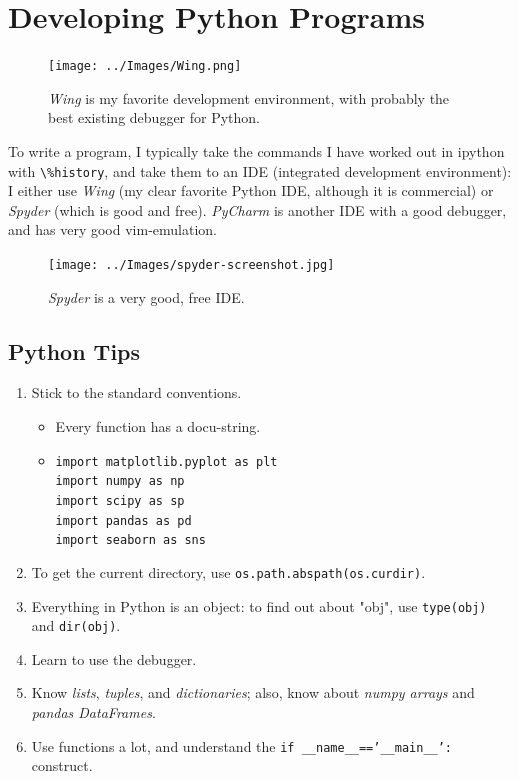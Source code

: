 \section{Developing Python Programs}

\begin{figure}
  \centering
  \texttt{[image: ../Images/Wing.png]}\\
  \caption{\emph{Wing} is my favorite development environment, with probably the best existing debugger for Python.}
\end{figure}

To write a program, I typically take the commands I have worked out in ipython with \lstinline{\%history}, and take them to an IDE (integrated development environment): I either use \emph{Wing} (my clear favorite Python IDE, although it is commercial) or \emph{Spyder} (which is good and free). \emph{PyCharm} is another IDE with a good debugger, and has very good vim-emulation.

\begin{figure}
  \centering
  \texttt{[image: ../Images/spyder-screenshot.jpg]}\\
  \caption{\emph{Spyder} is a very good, free IDE.}
\end{figure}

\subsection{Python Tips}

\begin{enumerate}
  \item Stick to the standard conventions.
      \begin{itemize}
        \item Every function has a docu-string.
        \item \texttt{import matplotlib.pyplot as plt}\\
            \texttt{import numpy as np}\\
            \texttt{import scipy as sp}\\
            \texttt{import pandas as pd}\\
            \texttt{import seaborn as sns}
      \end{itemize}
  \item To get the current directory, use \texttt{os.path.abspath(os.curdir)}.
  \item Everything in Python is an object: to find out about "obj", use \texttt{type(obj)} and \texttt{dir(obj)}.
  \item Learn to use the debugger.
  \item Know \emph{lists}, \emph{tuples}, and \emph{dictionaries}; also, know about \emph{numpy arrays} and \emph{pandas DataFrames}.
  \item Use functions a lot, and understand the \texttt{if \_\_name\_\_=='\_\_main\_\_':} construct.
\end{enumerate}


